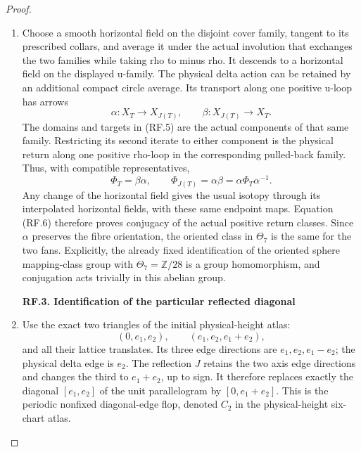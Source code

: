 \begin{proof}
\begin{enumerate}[label=\arabic*.]
\item Choose a smooth horizontal field on the disjoint cover family,
tangent to its prescribed collars, and average it under the actual
involution that exchanges the two families while taking rho to minus
rho. It descends to a horizontal field on the displayed u-family.
The physical delta action can be retained by an additional compact
circle average. Its transport along one positive u-loop has arrows
\[
           \alpha:X_T\longrightarrow X_{J(T)},\qquad
           \beta:X_{J(T)}\longrightarrow X_T.
                                                               \tag{RF.5}
\]
The domains and targets in (RF.5) are the actual components of that
same family. Restricting its second iterate to either component is
the physical return along one positive rho-loop in the corresponding
pulled-back family. Thus, with compatible representatives,
\[
                \Phi_T=\beta\alpha,\qquad
                \Phi_{J(T)}=\alpha\beta
                       =\alpha\Phi_T\alpha^{-1}.         \tag{RF.6}
\]
Any change of the horizontal field gives the usual isotopy through
its interpolated horizontal fields, with these same endpoint maps.
Equation (RF.6) therefore proves conjugacy of the actual positive
return classes. Since \(\alpha\) preserves the fibre orientation,
the oriented class in \(\Theta_7\) is the same for the two fans.
Explicitly, the already fixed identification of the oriented sphere
mapping-class group with \(\Theta_7=\mathbb Z/28\) is a group
homomorphism, and conjugation acts trivially in this abelian group.

\par

\medskip\noindent\textbf{RF.3. Identification of the particular reflected diagonal}

\par\nobreak

\item Use the exact two triangles of the initial physical-height atlas:
\[
       (0,e_1,e_2),\qquad(e_1,e_2,e_1+e_2),
                                                               \tag{RF.7}
\]
and all their lattice translates. Its three edge directions are
\(e_1,e_2,e_1-e_2\); the physical delta edge is \(e_2\).
The reflection \(J\) retains the two axis edge directions and
changes the third to \(e_1+e_2\), up to sign. It therefore replaces
exactly the diagonal \([e_1,e_2]\) of the unit parallelogram by
\([0,e_1+e_2]\). This is the periodic nonfixed diagonal-edge
flop, denoted \(C_2\) in the physical-height six-chart atlas.


\end{enumerate}
\end{proof}

